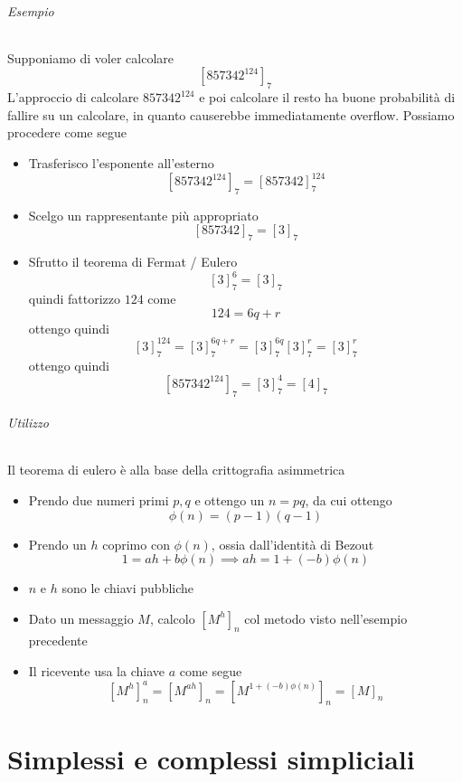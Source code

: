 \documentclass[a4paper]{report}
\begin{document}
\paragraph{Esempio}
Supponiamo di voler calcolare
\[
    [857342^{124}]_7
\]
L'approccio di calcolare $857342^{124}$ e poi calcolare il resto ha buone probabilità di fallire su un calcolare, in quanto causerebbe immediatamente overflow. Possiamo procedere come segue
\begin{itemize}
    \item Trasferisco l'esponente all'esterno
          \[
              [857342^{124}]_7=[857342]_7^{124}
          \]
    \item Scelgo un rappresentante più appropriato
          \[
              [857342]_7=[3]_7
          \]
    \item Sfrutto il teorema di Fermat / Eulero
          \[
              [3]_7^6=[3]_7
          \]
          quindi fattorizzo $124$ come
          \[
              124=6q+r
          \]
          ottengo quindi
          \[
              [3]_7^{124}=[3]_7^{6q+r}=[3]_7^{6q}[3]_7^r=[3]_7^r
          \]
          ottengo quindi
          \[
              [857342^{124}]_7=[3]_7^4=[4]_7
          \]
\end{itemize}
\paragraph{Utilizzo} Il teorema di eulero è alla base della crittografia asimmetrica
\begin{itemize}
    \item Prendo due numeri primi $p,q$ e ottengo un $n=pq$, da cui ottengo
          \[
              \phi(n)=(p-1)(q-1)
          \]
    \item Prendo un $h$ coprimo con $\phi(n)$, ossia dall'identità di Bezout
          \[
              1=ah+b\phi(n)\implies ah=1+(-b)\phi(n)
          \]
    \item $n$ e $h$ sono le chiavi pubbliche
    \item Dato un messaggio $M$, calcolo $[M^h]_n$ col metodo visto nell'esempio precedente
    \item Il ricevente usa la chiave $a$ come segue
          \[
              [M^h]^a_n=[M^{ah}]_n=[M^{1+(-b)\phi(n)}]_n=[M]_n
          \]
\end{itemize}
\part{Simplessi e complessi simpliciali}
\end{document}
